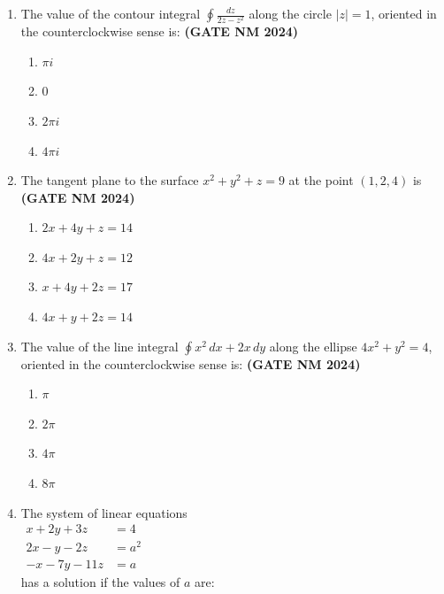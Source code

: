 \documentclass[journal,15pt,onecolumn]{IEEEtran}
\theoremstyle{remark}
\begin{document}
\begin{enumerate}
    \item
    The value of the contour integral 
    $
    \oint \frac{dz}{2z - z^2}
    $
    along the circle \(|z| = 1\), oriented in the counterclockwise sense is:\hfill \textbf{ (GATE NM 2024)}
    
    \begin{enumerate}
        \item $ \pi i $
        \item $ 0 $
        \item $ 2\pi i $
        \item $ 4\pi i $
    \end{enumerate}

    \item 
    The tangent plane to the surface $ x^2 + y^2 + z = 9 $ at the point $ (1, 2, 4) $ is\hfill \textbf{ (GATE NM 2024)}
    
    \begin{enumerate}
        \item $ 2x + 4y + z = 14 $
        \item $ 4x + 2y + z = 12 $
        \item $ x + 4y + 2z = 17 $
        \item $ 4x + y + 2z = 14 $
    \end{enumerate}

 \item The value of the line integral 
    $ \oint x^2\, dx + 2x\, dy $
    along the ellipse $ 4x^2 + y^2 = 4 $, oriented in the counterclockwise sense is:\hfill \textbf{ (GATE NM 2024)}

    \begin{enumerate}
        \item $\pi$
        \item $2\pi$
        \item $4\pi$
        \item $8\pi$
    \end{enumerate}

    \item The system of linear equations \\
    $
    \begin{aligned}
        x + 2y + 3z &= 4 \\
        2x - y - 2z &= a^2 \\
        -x - 7y - 11z &= a
    \end{aligned}
    $ \\
    has a solution if the values of $a$ are:


\end{enumerate}
\end{document}
